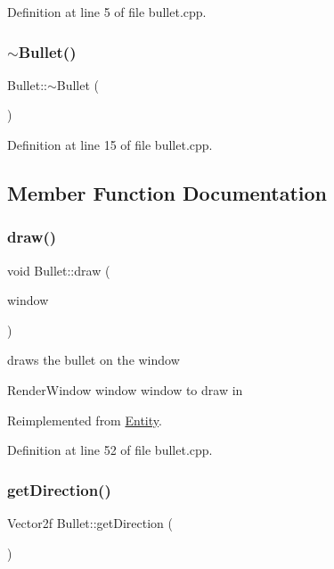 Definition at line 5 of file bullet.\+cpp.

\mbox{\label{class_bullet_aaeb5cb41d7db89f49007b08b41f1bfcf}} 
\subsubsection{\texorpdfstring{$\sim$\+Bullet()}{~Bullet()}}
{\footnotesize\ttfamily Bullet\+::$\sim$\+Bullet (\begin{DoxyParamCaption}{ }\end{DoxyParamCaption})}



Definition at line 15 of file bullet.\+cpp.



\subsection{Member Function Documentation}
\mbox{\label{class_bullet_a14a795a7a6f4d0ad2e96a19b79afc5ee}} 
\subsubsection{\texorpdfstring{draw()}{draw()}}
{\footnotesize\ttfamily void Bullet\+::draw (\begin{DoxyParamCaption}\item[{Render\+Window \&}]{window }\end{DoxyParamCaption})\hspace{0.3cm}{\ttfamily [virtual]}}



draws the bullet on the window 

Render\+Window window window to draw in 

Reimplemented from \hyperlink{class_entity_a030c3aa6641df7981a2d8a3fba890ec7}{Entity}.



Definition at line 52 of file bullet.\+cpp.

\mbox{\label{class_bullet_a6b6acf4d172bc98a9371cc431eca4e0d}} 
\subsubsection{\texorpdfstring{get\+Direction()}{getDirection()}}
{\footnotesize\ttfamily Vector2f Bullet\+::get\+Direction (\begin{DoxyParamCaption}{ }\end{DoxyParamCaption})}




